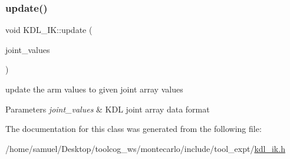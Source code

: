 \subsubsection{\texorpdfstring{update()}{update()}}
{\footnotesize\ttfamily void K\+D\+L\+\_\+\+I\+K\+::update (\begin{DoxyParamCaption}\item[{Jnt\+Array}]{joint\+\_\+values }\end{DoxyParamCaption})\hspace{0.3cm}{\ttfamily [inline]}}



update the arm values to given joint array values 


\begin{DoxyParams}{Parameters}
{\em joint\+\_\+values} & K\+DL joint array data format \\
\hline
\end{DoxyParams}


The documentation for this class was generated from the following file\+:\begin{DoxyCompactItemize}
\item 
/home/samuel/\+Desktop/toolcog\+\_\+ws/montecarlo/include/tool\+\_\+expt/\hyperlink{kdl__ik_8h}{kdl\+\_\+ik.\+h}\end{DoxyCompactItemize}
